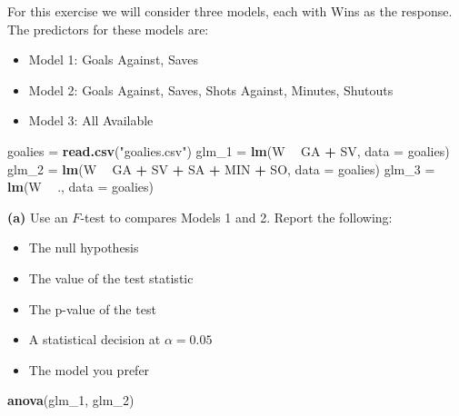 \documentclass[
]{article}
\newenvironment{Shaded}{\begin{snugshade}}{\end{snugshade}}
\newcommand{\DataTypeTok}[1]{\textcolor[rgb]{0.13,0.29,0.53}{#1}}
\newcommand{\DecValTok}[1]{\textcolor[rgb]{0.00,0.00,0.81}{#1}}
\newcommand{\KeywordTok}[1]{\textcolor[rgb]{0.13,0.29,0.53}{\textbf{#1}}}
\newcommand{\NormalTok}[1]{#1}
\newcommand{\OperatorTok}[1]{\textcolor[rgb]{0.81,0.36,0.00}{\textbf{#1}}}
\newcommand{\StringTok}[1]{\textcolor[rgb]{0.31,0.60,0.02}{#1}}
\providecommand{\tightlist}{%
  \setlength{\itemsep}{0pt}\setlength{\parskip}{0pt}}
\begin{document}
For this exercise we will consider three models, each with Wins as the
response. The predictors for these models are:

\begin{itemize}
\tightlist
\item
  Model 1: Goals Against, Saves
\item
  Model 2: Goals Against, Saves, Shots Against, Minutes, Shutouts
\item
  Model 3: All Available
\end{itemize}

\begin{Shaded}
\begin{Highlighting}[]
\NormalTok{goalies =}\StringTok{ }\KeywordTok{read.csv}\NormalTok{(}\StringTok{"goalies.csv"}\NormalTok{)}
\NormalTok{glm_}\DecValTok{1}\NormalTok{ =}\StringTok{ }\KeywordTok{lm}\NormalTok{(W }\OperatorTok{~}\StringTok{ }\NormalTok{GA }\OperatorTok{+}\StringTok{ }\NormalTok{SV, }\DataTypeTok{data =}\NormalTok{ goalies)}
\NormalTok{glm_}\DecValTok{2}\NormalTok{ =}\StringTok{ }\KeywordTok{lm}\NormalTok{(W }\OperatorTok{~}\StringTok{ }\NormalTok{GA }\OperatorTok{+}\StringTok{ }\NormalTok{SV }\OperatorTok{+}\StringTok{ }\NormalTok{SA }\OperatorTok{+}\StringTok{ }\NormalTok{MIN }\OperatorTok{+}\StringTok{ }\NormalTok{SO, }\DataTypeTok{data =}\NormalTok{ goalies)}
\NormalTok{glm_}\DecValTok{3}\NormalTok{ =}\StringTok{ }\KeywordTok{lm}\NormalTok{(W }\OperatorTok{~}\StringTok{ }\NormalTok{., }\DataTypeTok{data =}\NormalTok{ goalies)}
\end{Highlighting}
\end{Shaded}

\textbf{(a)} Use an \(F\)-test to compares Models 1 and 2. Report the
following:

\begin{itemize}
\tightlist
\item
  The null hypothesis
\item
  The value of the test statistic
\item
  The p-value of the test
\item
  A statistical decision at \(\alpha = 0.05\)
\item
  The model you prefer
\end{itemize}

\begin{Shaded}
\begin{Highlighting}[]
\KeywordTok{anova}\NormalTok{(glm_}\DecValTok{1}\NormalTok{, glm_}\DecValTok{2}\NormalTok{)}
\end{Highlighting}
\end{Shaded}
\end{document}
